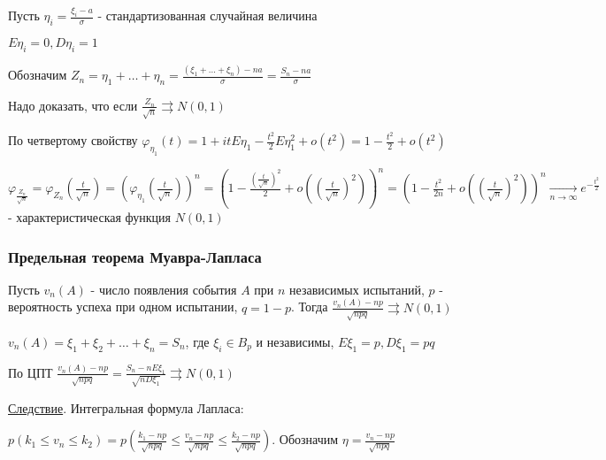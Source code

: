 \documentclass[12pt]{article}
\begin{document}
\begin{MyProof}
    Пусть $\eta_i = \frac{\xi_i - a}{\sigma}$ - стандартизованная случайная величина

    $E\eta_i = 0, D\eta_i = 1$

    Обозначим $Z_n = \eta_1 + \dots + \eta_n = \frac{(\xi_1 + \dots + \xi_n) - na}{\sigma} = \frac{S_n - na}{\sigma}$

    Надо доказать, что если $\frac{Z_n}{\sqrt{n}} \rightrightarrows N(0, 1)$

    По четвертому свойству $\varphi_{\eta_1}(t) = 1 + itE\eta_1 - \frac{t^2}{2} E\eta_1^2 + o(t^2) = 1 - \frac{t^2}{2} + o(t^2)$

    $\varphi_{\frac{Z_n}{\sqrt{n}}} = \varphi_{Z_n}\left(\frac{t}{\sqrt{n}}\right) = \left(\varphi_{\eta_1}\left(\frac{t}{\sqrt{n}}\right)\right)^n = 
    \left(1 - \frac{\left(\frac{t}{\sqrt{n}}\right)^2}{2} + o\left(\left(\frac{t}{\sqrt{n}}\right)^2\right)\right)^n =
    \left(1 - \frac{t^2}{2n} + o\left(\left(\frac{t}{\sqrt{n}}\right)^2\right)\right)^n \underset{n \to \infty}{\longrightarrow} e^{-\frac{t^2}{2}}$ - 
    характеристическая функция $N(0, 1)$
\end{MyProof}

\subsubsection{Предельная теорема Муавра-Лапласа}

\begin{MyTheorem}
    \Ths Пусть $v_n(A)$ - число появления события $A$ при $n$ независимых испытаний, $p$ - вероятность успеха при одном испытании, $q = 1 - p$.
    Тогда $\frac{v_n(A) - np}{\sqrt{npq}} \rightrightarrows N(0, 1)$
\end{MyTheorem}

\begin{MyProof}
    $v_n(A) = \xi_1 + \xi_2 + \dots + \xi_n = S_n$, где $\xi_i \in B_p$ и независимы, $E\xi_1 = p, D\xi_1 = pq$

    По ЦПТ $\frac{v_n(A) - np}{\sqrt{npq}} = \frac{S_n - nE\xi_1}{\sqrt{nD\xi_1}} \rightrightarrows N(0, 1)$
\end{MyProof}

\underline{Следствие}. Интегральная формула Лапласа:

$p(k_1 \leq v_n \leq k_2) = p\left(\frac{k_1 - np}{\sqrt{npq}} \leq \frac{v_n - np}{\sqrt{npq}} \leq \frac{k_2 - np}{\sqrt{npq}}\right)$. Обозначим $\eta = \frac{v_n - np}{\sqrt{npq}}$
\end{document}
